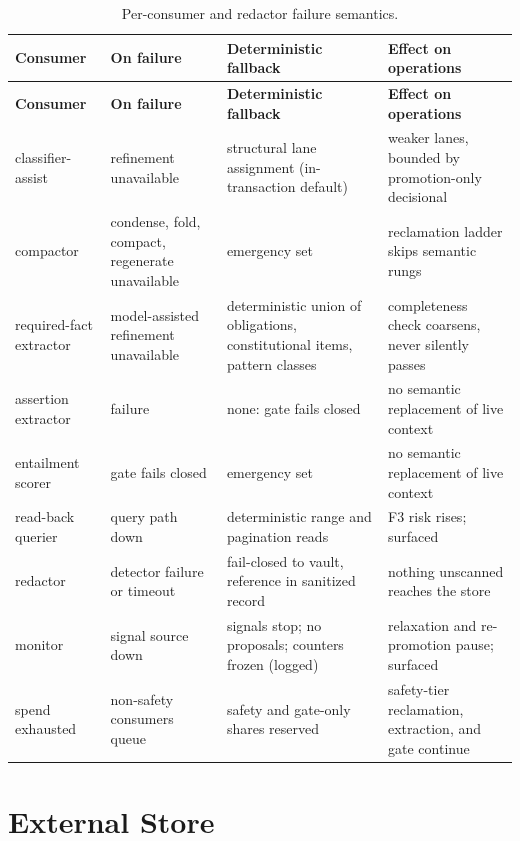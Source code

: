 \documentclass[11pt]{article}
\begin{document}
{\footnotesize
\begin{longtable}{@{}p{2.6cm}p{3.6cm}p{3.8cm}p{3.5cm}@{}}
\caption{Per-consumer and redactor failure semantics.}\label{tab:consumers}\\
\toprule
\textbf{Consumer} & \textbf{On failure} & \textbf{Deterministic fallback} & \textbf{Effect on operations} \\
\midrule
\endfirsthead
\toprule
\textbf{Consumer} & \textbf{On failure} & \textbf{Deterministic fallback} & \textbf{Effect on operations} \\
\midrule
\endhead
classifier-assist & refinement unavailable & structural lane assignment (in-transaction default) & weaker lanes, bounded by promotion-only decisional \\
compactor & condense, fold, compact, regenerate unavailable & emergency set & reclamation ladder skips semantic rungs \\
required-fact extractor & model-assisted refinement unavailable & deterministic union of obligations, constitutional items, pattern classes & completeness check coarsens, never silently passes \\
assertion extractor & failure & none: gate fails closed & no semantic replacement of live context \\
entailment scorer & gate fails closed & emergency set & no semantic replacement of live context \\
read-back querier & query path down & deterministic range and pagination reads & F3 risk rises; surfaced \\
redactor & detector failure or timeout & fail-closed to vault, reference in sanitized record & nothing unscanned reaches the store \\
monitor & signal source down & signals stop; no proposals; counters frozen (logged) & relaxation and re-promotion pause; surfaced \\
spend exhausted & non-safety consumers queue & safety and gate-only shares reserved & safety-tier reclamation, extraction, and gate continue \\
\bottomrule
\end{longtable}
}

\section{External Store}
\label{sec:store}
\end{document}
